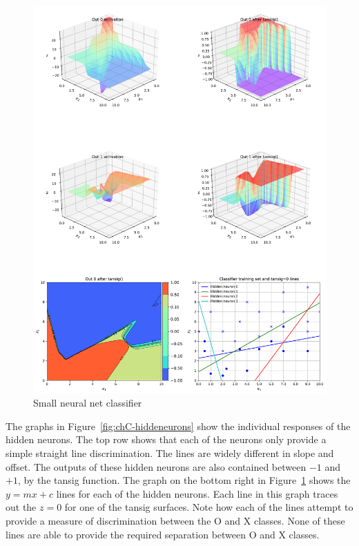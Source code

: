 \begin{figure}[tbhp]
\centering
\includegraphics[width=\textwidth]{pic/chC-classif0}
\caption{Small neural net classifier\label{fig:chC-classif0}}
\end{figure}

The graphs in Figure~\ref{fig:chC-hiddeneurons} show the individual responses of the hidden neurons.   The top row shows that each of the neurons only provide a simple straight line discrimination.   The lines are widely different in slope and offset.  The outputs of these hidden neurons are also contained between $-1$ and $+1$, by the tansig function.   
The graph on the bottom right in Figure~\ref{fig:chC-classif0} shows the $y=mx+c$ lines for each of the hidden neurons.  Each line in this graph  traces out the $z=0$  for one of the tansig surfaces.  Note how each of the lines attempt to provide a measure of discrimination between the O and X classes.  None of these lines are able to provide the required separation between O and X classes.   

